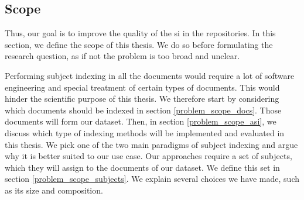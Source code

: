 \subsection{Scope} \label{problem_scope}

Thus, our goal is to improve the quality of the \acrshort{si} in the repositories. In this section, we define the scope of this thesis. We do so before formulating the research question, as if not the problem is too broad and unclear.

Performing subject indexing in all the documents would require a lot of software engineering and special treatment of certain types of documents. This would hinder the scientific purpose of this thesis. We therefore start by considering which documents should be indexed in section \ref{problem_scope_docs}. Those documents will form our dataset. Then, in section \ref{problem_scope_asi}, we discuss which type of indexing methods will be implemented and evaluated in this thesis. We pick one of the two main paradigms of subject indexing and argue why it is better suited to our use case. Our approaches require a set of subjects, which they will assign to the documents of our dataset. We define this set in section \ref{problem_scope_subjects}. We explain several choices we have made, such as its size and composition.



